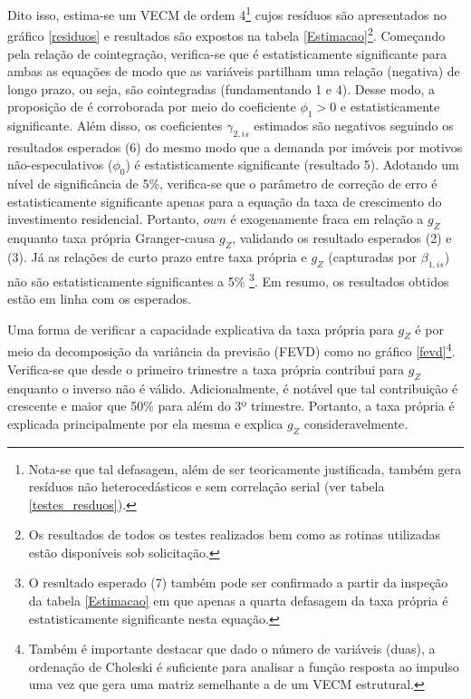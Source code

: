 Dito isso,  estima-se um VECM de ordem 4\footnote{Nota-se que tal defasagem, além de ser teoricamente justificada, também gera resíduos não heterocedásticos e sem correlação serial (ver tabela \ref{testes_resduos}).} cujos resíduos são apresentados no gráfico \ref{residuos} e resultados são expostos na tabela \ref{Estimacao}\footnote{Os resultados de todos os testes realizados bem como as rotinas utilizadas estão disponíveis sob solicitação.}.
Começando pela relação de cointegração, verifica-se que é estatisticamente significante para ambas as equações de modo que as variáveis partilham uma relação (negativa) de longo prazo, ou seja, são cointegradas (fundamentando 1 e 4).
Desse modo, a proposição de \textcite{teixeira_crescimento_2015} é corroborada por meio do coeficiente $\phi_1> 0$ e estatisticamente significante.
Além disso, os coeficientes $\gamma_{2,is}$ estimados são negativos seguindo os resultados esperados (6) do mesmo modo que a demanda por imóveis por motivos não-especulativos ($\phi_0$) é estatisticamente significante (resultado 5).
Adotando um nível de significância de 5\%, verifica-se que o parâmetro de correção de erro é estatisticamente significante apenas para a equação da taxa de crescimento do investimento residencial. Portanto, $own$ é exogenamente fraca em relação a $g_Z$ enquanto taxa própria Granger-causa $g_Z$, validando os resultado esperados (2) e (3).
Já as relações de curto prazo entre taxa própria e $g_Z$ (capturadas por $\beta_{1,is}$) não são estatisticamente significantes a 5\% \footnote{O resultado esperado (7) também pode ser confirmado a partir da inspeção da tabela \ref{Estimacao} em que apenas a quarta defasagem da taxa própria é estatisticamente significante nesta equação.}. Em resumo, os resultados obtidos estão em linha com os esperados. 

Uma forma de verificar a capacidade explicativa da taxa própria para $g_Z$ é por meio da decomposição da variância da previsão (FEVD) como no gráfico \ref{fevd}\footnote{Também é importante destacar que dado o número de variáveis (duas), a ordenação de Choleski é suficiente para analisar a função resposta ao impulso uma vez que gera uma matriz semelhante a de um VECM estrutural. 
}. Verifica-se que desde o primeiro trimestre a taxa própria contribui para $g_Z$ enquanto o inverso não é válido. Adicionalmente, é notável que tal contribuição é crescente e maior que 50\% para além do 3º trimestre. Portanto, a taxa própria é explicada principalmente por ela mesma e explica $g_Z$ consideravelmente.

